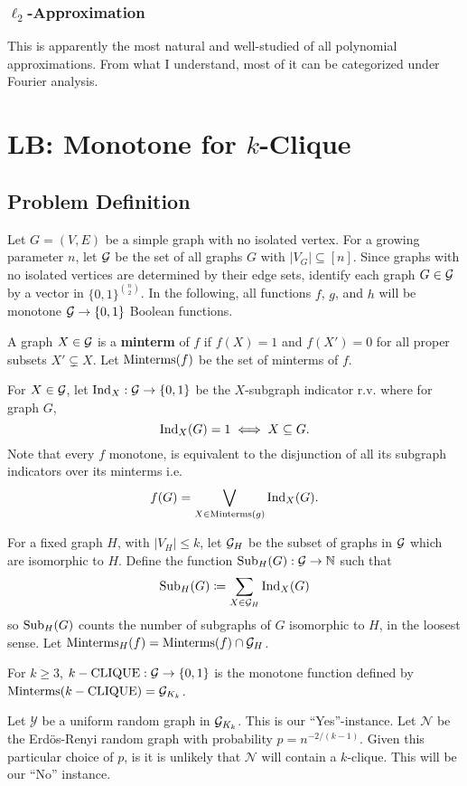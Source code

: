\documentclass[11pt]{article}
\begin{document}
	\subsubsection{\texorpdfstring{$\ell_{2}$}{2}-Approximation}
	This is apparently the most natural and well-studied of all polynomial approximations. From what I understand, most of it can be categorized under Fourier analysis. 
	
	\section{LB: Monotone for \texorpdfstring{$k$}{k}-Clique}
	\subsection{Problem Definition}
	Let $G = (V, E)$ be a simple graph with no isolated vertex. For a growing parameter $n$, let $\mathcal{G}$ be the set of all graphs $G$ with $|V_G| \subseteq [n]$. Since graphs with no isolated vertices are determined by their edge sets, identify each graph $G \in \mathcal{G}$ by a vector in $\{0,1\}^{\binom{n}{2}}$. In the following, all functions $f$, $g$, and $h$ will be monotone $\mathcal{G} \rightarrow \{0,1\}$ Boolean functions. 
	
	A graph $X \in \mathcal{G}$ is a \textbf{minterm} of $f$ if $f(X) = 1$ and $f(X') = 0$ for all proper subsets $X' \subsetneq X$. Let $\mathrm{Minterms}(f)$ be the set of minterms of $f$.
	
	For $X \in \mathcal{G}$, let $\mathrm{Ind}_{X}: \mathcal{G} \rightarrow \{0,1\}$ be the $X$-subgraph indicator r.v. where for graph $G$,
	\[\mathrm{Ind}_{X}(G) = 1 \iff X \subseteq G.\]
	Note that every $f$ monotone, is equivalent to the disjunction of all its subgraph indicators over its minterms i.e.
	\[f(G) = \bigvee_{X \in \mathrm{Minterms}(g)}\mathrm{Ind}_{X}(G).\]
	
	For a fixed graph $H$, with $|V_H| \leq k$, let $\mathcal{G}_H$ be the subset of graphs in $\mathcal{G}$ which are isomorphic to $H$. Define the function $\mathrm{Sub}_{H}(G): \mathcal{G} \rightarrow \mathbb{N}$ such that 
	\[\mathrm{Sub}_{H}(G) \coloneqq \sum_{X \in \mathcal{G}_H} \mathrm{Ind}_X(G)\]
	so $\mathrm{Sub}_{H}(G)$ counts the number of subgraphs of $G$ isomorphic to $H$, in the loosest sense. Let $\mathrm{Minterms}_H(f) = \mathrm{Minterms}(f) \cap \mathcal{G}_H$. 
	
	For $k \geq 3$, $k-\mathrm{CLIQUE}: \mathcal{G} \rightarrow \{0,1\}$ is the monotone function defined by $\mathrm{Minterms}(k-\mathrm{CLIQUE}) = \mathcal{G}_{K_k}$. 
	
	Let $\mathcal{Y}$ be a uniform random graph in $\mathcal{G}_{K_k}$. This is our ``Yes''-instance. Let $\mathcal{N}$ be the Erd\"{o}s-Renyi random graph with probability $p = n^{-2/(k-1)}$. Given this particular choice of $p$, is it is unlikely that $\mathcal{N}$ will contain a $k$-clique. This will be our ``No'' instance.
	
\end{document}
